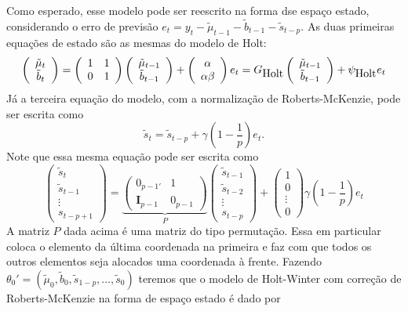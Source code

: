 \documentclass[
  letterpaper,
  DIV=11,
  numbers=noendperiod]{scrreprt}
\theoremstyle{definition}
\theoremstyle{plain}
\theoremstyle{definition}
\theoremstyle{plain}
\theoremstyle{remark}
\begin{document}
Como esperado, esse modelo pode ser reescrito na forma dse espaço
estado, considerando o erro de previsão
\(e_t=y_t-\tilde{\mu}_{t-1}-\tilde{b}_{t-1}-\tilde{s}_{t-p}\). As duas
primeiras equações de estado são as mesmas do modelo de Holt:
\[\left(\begin{array}{c} \tilde{\mu}_t \\ \tilde{b}_t\end{array}\right)=\left(\begin{array}{cc}1 & 1 \\ 0 & 1\end{array}\right)\left(\begin{array}{c} \tilde{\mu}_{t-1} \\ \tilde{b}_{t-1}\end{array}\right)+\left(\begin{array}{c} \alpha \\ \alpha\beta\end{array}\right)e_t=G_{\hbox{Holt}}\left(\begin{array}{c} \tilde{\mu}_{t-1} \\ \tilde{b}_{t-1}\end{array}\right)+\psi_{\hbox{Holt}}e_t\]
Já a terceira equação do modelo, com a normalização de Roberts-McKenzie,
pode ser escrita como
\[\tilde{s}_t=\tilde{s}_{t-p}+\gamma\left(1-\frac{1}{p}\right)e_t.\]
Note que essa mesma equação pode ser escrita como
\[\left(\begin{array}{c}\tilde{s}_t\\ \tilde{s}_{t-1} \\ \vdots \\ s_{t-p+1}\end{array}\right)=\underbrace{\left(\begin{array}{c} 0_{p-1'} & 1 \\ \textbf{I}_{p-1} & 0_{p-1} \end{array}\right)}_{P}\left(\begin{array}{c}\tilde{s}_{t-1}\\ \tilde{s}_{t-2} \\ \vdots \\ s_{t-p}\end{array}\right)+\left(\begin{array}{c}1\\ 0 \\ \vdots \\ 0\end{array}\right)\gamma\left(1-\frac{1}{p}\right) e_t\]
A matriz \(P\) dada acima é uma matriz do tipo permutação. Essa em
particular coloca o elemento da última coordenada na primeira e faz com
que todos os outros elementos seja alocados uma coordenada à frente.
Fazendo
\(\theta_0'=(\tilde{\mu}_0,\tilde{b}_0,\tilde{s}_{1-p},\ldots,\tilde{s}_0)\)
teremos que o modelo de Holt-Winter com correção de Roberts-McKenzie na
forma de espaço estado é dado por
\end{document}
